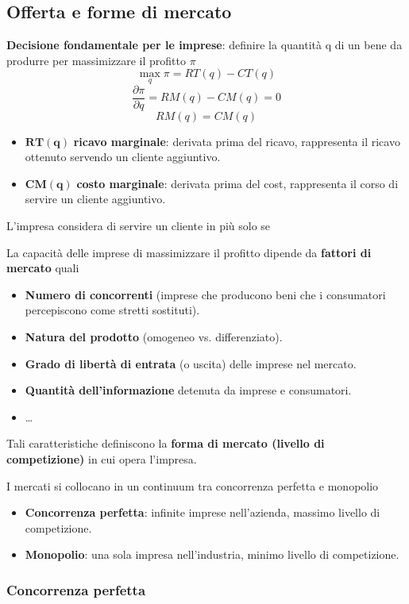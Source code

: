 \documentclass[../main.tex]{subfiles}
\begin{document}
\subsection{Offerta e forme di mercato}

\textbf{Decisione fondamentale per le imprese}: definire la quantità q di un bene da produrre per massimizzare il profitto $\pi$
$$\max_q \pi = RT(q) - CT(q)$$
$$\frac{\partial \pi}{\partial q}=RM(q) - CM(q) = 0$$
$$RM(q) = CM(q)$$
\begin{itemize}
\item $\mathbf{RT(q)}$ \textbf{ricavo marginale}: derivata prima del ricavo, rappresenta il ricavo ottenuto servendo un cliente aggiuntivo.
\item $\mathbf{CM(q)}$ \textbf{costo marginale}: derivata prima del cost, rappresenta il corso di servire un cliente aggiuntivo.
\end{itemize}

L'impresa considera di servire un cliente in più solo se 

La capacità delle imprese di massimizzare il profitto dipende da \textbf{fattori di mercato} quali
\begin{itemize}
    \item \textbf{Numero di concorrenti} (imprese che producono beni che i consumatori percepiscono come stretti sostituti).
    \item \textbf{Natura del prodotto} (omogeneo vs. differenziato).
    \item \textbf{Grado di libertà di entrata} (o uscita) delle imprese nel mercato.
    \item \textbf{Quantità dell'informazione} detenuta da imprese e consumatori.
    \item \dots
\end{itemize}

Tali caratteristiche definiscono la \textbf{forma di mercato (livello di competizione)} in cui opera l'impresa.

I mercati si collocano in un continuum tra concorrenza perfetta e monopolio
\begin{itemize}
    \item \textbf{Concorrenza perfetta}: infinite imprese nell'azienda, massimo livello di competizione.
    \item \textbf{Monopolio}: una sola impresa nell'industria, minimo livello di competizione.
\end{itemize}

\subsubsection{Concorrenza perfetta}
\end{document}
